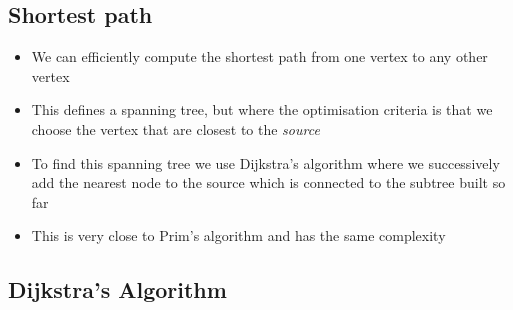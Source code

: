 \Outline %



\begin{slide}
\section[-1]{Shortest path}

\begin{PauseHighLight}
  \begin{itemize}
  \item We can efficiently compute the shortest path from one vertex to
    any other vertex\pause
  \item This defines a spanning tree, but where the optimisation
    criteria is that we choose the vertex that are closest to the
    \textit{source}\pause
  \item To find this spanning tree we use Dijkstra's algorithm where we
    successively add the nearest node to the source which is connected
    to the subtree built so far\pause
  \item This is very close to Prim's algorithm and has the same
    complexity\pause
  \end{itemize}
\end{PauseHighLight}

\end{slide}

\begin{slide}
\section[-2]{Dijkstra's Algorithm}

\pb
\begin{center}
  \pause
\end{center}
\end{slide}


